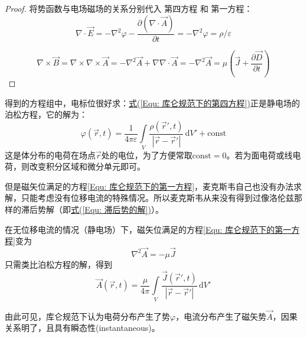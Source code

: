         {\color{gray}\begin{proof}
            将势函数与电场磁场的关系分别代入 第四方程 和 第一方程：
            \begin{equation*}
                \nabla\cdot\vec{E}
                =-\nabla^2 \varphi-\frac{\partial \left(\nabla\cdot\vec{A}\right)}{\partial t}
                =-\nabla^2 \varphi
                =\rho /\varepsilon
            \end{equation*}
            
            \begin{equation*}
                \nabla\times\vec{B}
                =\nabla\times \nabla\times\vec{A}=-\nabla^2 \vec{A}+\nabla \nabla\cdot\vec{A}
                =-\nabla^2 \vec{A}
                =\mu \left(\vec{J}+\frac{\partial \vec{D}}{\partial t}\right)
            \end{equation*}
        \end{proof}}

        得到的方程组中，电标位很好求：\hyperref[Equ: 库仑规范下的第四方程]{式(\ref*{Equ: 库仑规范下的第四方程})}正是静电场的泊松方程，它的解为：
        \begin{equation}
            \varphi(\vec{r},t)=\frac{1}{4\pi \varepsilon}\int\limits_V \frac{\rho(\vec{r}',t)}{|\vec{r}-\vec{r}'|}\,\mathrm{d}V'+\mathrm{const}
        \end{equation}
        这是体分布的电荷在场点$\vec{r}$处的电位，为了方便常取$\mathrm{const}=0$。若为面电荷或线电荷，则改变积分区域和微分单元即可。

        但是磁矢位满足的方程\eqref{Equ: 库仑规范下的第一方程}，麦克斯韦自己也没有办法求解，只能考虑没有位移电流的特殊情况。所以麦克斯韦从来没有得到过像洛伦兹那样的滞后势解（即\hyperref[Equ: 滞后势的解]{式(\ref*{Equ: 滞后势的解})}）。

        在无位移电流的情况（静电场）下，磁矢位满足的方程\eqref{Equ: 库仑规范下的第一方程}变为
        \begin{equation}
            \nabla^2 \vec{A}=-\mu \vec{J}
        \end{equation}
        只需类比泊松方程的解，得到
        \begin{equation}
            \vec{A}(\vec{r},t)=\frac{\mu}{4\pi}\int\limits_V \frac{\vec{J}(\vec{r}',t)}{|\vec{r}-\vec{r}'|}\,\mathrm{d}V'
        \end{equation}

        由此可见，库仑规范下认为电荷分布产生了势$\varphi$，电流分布产生了磁矢势$\vec{A}$，因果关系明了，且具有瞬态性(instantaneous)。
        
